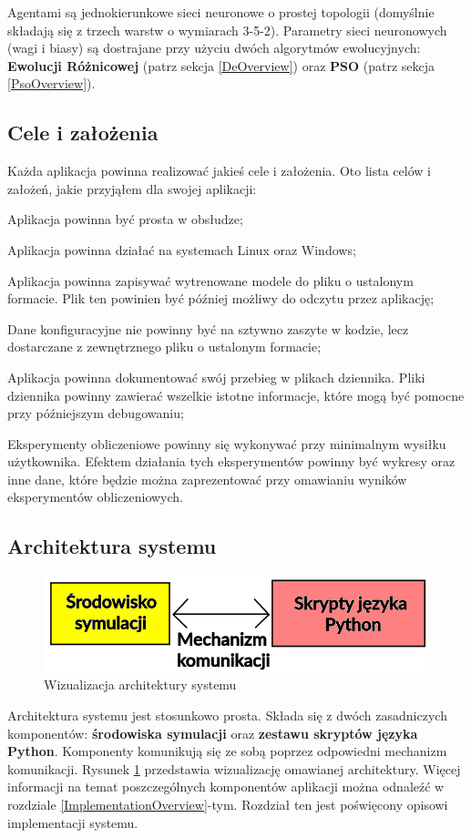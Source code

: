 Agentami są jednokierunkowe sieci neuronowe \cite{multilayerNN:article} o prostej topologii (domyślnie składają się z trzech warstw o wymiarach 3-5-2). Parametry sieci neuronowych (wagi i biasy) są dostrajane przy użyciu dwóch algorytmów ewolucyjnych: \textbf{Ewolucji Różnicowej} (patrz sekcja \ref{DeOverview}) oraz \textbf{PSO} (patrz sekcja \ref{PsoOverview}).

\subsection{Cele i założenia}
Każda aplikacja powinna realizować jakieś cele i założenia. Oto lista celów i założeń, jakie przyjąłem dla swojej aplikacji:
\begin{enumerate*}
\item Aplikacja powinna być prosta w obsłudze;
\item Aplikacja powinna działać na systemach Linux oraz Windows;
\item Aplikacja powinna zapisywać wytrenowane modele do pliku o ustalonym formacie. Plik ten powinien być później możliwy do odczytu przez aplikację;
\item Dane konfiguracyjne nie powinny być na sztywno zaszyte w kodzie, lecz dostarczane z zewnętrznego pliku o ustalonym formacie;
\item Aplikacja powinna dokumentować swój przebieg w plikach dziennika. Pliki dziennika powinny zawierać wszelkie istotne informacje, które mogą być pomocne przy późniejszym debugowaniu;
\item Eksperymenty obliczeniowe powinny się wykonywać przy minimalnym wysiłku użytkownika. Efektem działania tych eksperymentów powinny być wykresy oraz inne dane, które będzie można zaprezentować przy omawianiu wyników eksperymentów obliczeniowych.
\end{enumerate*}

\subsection{Architektura systemu}
\label{SoftwareArchSection}
\begin{figure}[H]
\centering
\includegraphics[width=15cm]{resources/figures/software_architecture.png}
\caption{Wizualizacja architektury systemu}
\label{SoftwareArchitecture}
\end{figure}
Architektura systemu jest stosunkowo prosta. Składa się z dwóch zasadniczych komponentów: \textbf{środowiska symulacji} oraz \textbf{zestawu skryptów języka Python}. Komponenty komunikują się ze sobą poprzez odpowiedni mechanizm komunikacji. Rysunek \ref{SoftwareArchitecture} przedstawia wizualizację omawianej architektury. Więcej informacji na temat poszczególnych komponentów aplikacji można odnaleźć w rozdziale \ref{ImplementationOverview}-tym. Rozdział ten jest poświęcony opisowi implementacji systemu.
